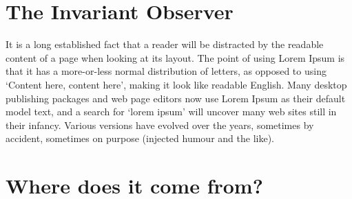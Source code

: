 



\section{The Invariant Observer } %


It is a long established fact that a reader will be distracted by the readable content of a page when looking at its layout. The point of using Lorem Ipsum is that it has a more-or-less normal distribution of letters, as opposed to using `Content here, content here', making it look like readable English. Many desktop publishing packages and web page editors now use Lorem Ipsum as their default model text, and a search for `lorem ipsum' will uncover many web sites still in their infancy. Various versions have evolved over the years, sometimes by accident, sometimes on purpose (injected humour and the like).

\section{Where does it come from?}  %
\label{section1.3}

